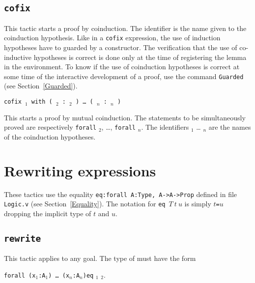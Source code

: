 \begin{coq_example*}
\begin{Variants}
\end{Variants}

\subsection{\tt cofix \ident}
\label{tactic:cofix}

This tactic starts a proof by coinduction. The identifier {\ident} is
the name given to the coinduction hypothesis.  Like in a {\tt cofix}
expression, the use of induction hypotheses have to guarded by a
constructor.  The verification that the use of co-inductive hypotheses
is correct is done only at the time of registering the lemma in the
environment. To know if the use of coinduction hypotheses is correct
at some time of the interactive development of a proof, use the
command {\tt Guarded} (see Section~\ref{Guarded}).


\begin{Variants}
  \item {\tt cofix \ident$_1$ with ( \ident$_2$
     :~\type$_2$ ) \dots\ (
    \ident$_n$  :~\type$_n$ )}

This starts a proof by mutual coinduction. The statements to be
simultaneously proved are respectively {\tt forall}
 {\type}$_2$, {\ldots}, {\tt forall}
   {\type}$_n$. The identifiers
    {\ident}$_1$ {\ldots} {\ident}$_n$ are the names of the
    coinduction hypotheses.

\end{Variants}

\section{Rewriting expressions}


These tactics use the equality {\tt eq:forall A:Type, A->A->Prop}
defined in file {\tt Logic.v} (see Section~\ref{Equality}). The
notation for {\tt eq}~$T~t~u$ is simply {\tt $t$=$u$} dropping the
implicit type of $t$ and $u$.

\subsection{\tt rewrite \term}
\label{rewrite}

This tactic applies to any goal. The type of {\term}
must have the form

\texttt{forall (x$_1$:A$_1$) \dots\ (x$_n$:A$_n$)}\texttt{eq} \term$_1$ \term$_2$.


\end{coq_example*}

